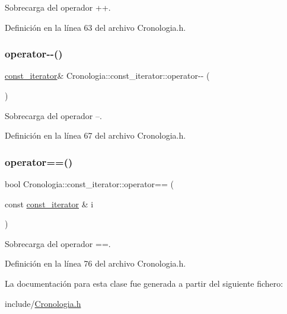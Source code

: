 Sobrecarga del operador ++. 



Definición en la línea 63 del archivo Cronologia.\+h.

\hypertarget{classCronologia_1_1const__iterator_a97058081d7804ead71ef8d21f987451f}{}\label{classCronologia_1_1const__iterator_a97058081d7804ead71ef8d21f987451f} 
\subsubsection{\texorpdfstring{operator-\/-\/()}{operator--()}}
{\footnotesize\ttfamily \hyperlink{classCronologia_1_1const__iterator}{const\+\_\+iterator}\& Cronologia\+::const\+\_\+iterator\+::operator-\/-\/ (\begin{DoxyParamCaption}{ }\end{DoxyParamCaption})\hspace{0.3cm}{\ttfamily [inline]}}



Sobrecarga del operador --. 



Definición en la línea 67 del archivo Cronologia.\+h.

\hypertarget{classCronologia_1_1const__iterator_a1211695d544d56470a9f0b0e4e720318}{}\label{classCronologia_1_1const__iterator_a1211695d544d56470a9f0b0e4e720318} 
\subsubsection{\texorpdfstring{operator==()}{operator==()}}
{\footnotesize\ttfamily bool Cronologia\+::const\+\_\+iterator\+::operator== (\begin{DoxyParamCaption}\item[{const \hyperlink{classCronologia_1_1const__iterator}{const\+\_\+iterator} \&}]{i }\end{DoxyParamCaption})\hspace{0.3cm}{\ttfamily [inline]}}



Sobrecarga del operador ==. 



Definición en la línea 76 del archivo Cronologia.\+h.



La documentación para esta clase fue generada a partir del siguiente fichero\+:\begin{DoxyCompactItemize}
\item 
include/\hyperlink{Cronologia_8h}{Cronologia.\+h}\end{DoxyCompactItemize}
